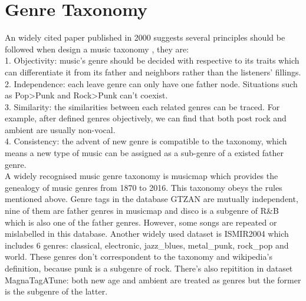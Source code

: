 \documentclass[a4paper, 11pt]{report}
\begin{document}
\section{Genre Taxonomy} 
 An widely cited paper published in 2000 suggests several principles should be followed when design a music taxonomy \cite{pachet2000taxonomy}, they are:\\
 1. Objectivity: music's genre should be decided with respective to its traits which can differentiate it from its father and neighbors rather than the listeners' fillings.\\
 2. Independence: each leave genre can only have one father node. Situations such as Pop\textgreater Punk and Rock\textgreater Punk can't coexist.\\
 3. Similarity: the similarities between each related genres can be traced. For example, after defined genres objectively, we can find that both post rock and ambient are usually non-vocal.\\
 4. Consistency: the advent of new genre is compatible to the taxonomy, which means a new type of music can be assigned as a sub-genre of a existed father genre.\\
A widely recognised music genre taxonomy is musicmap which provides the genealogy of music genres from 1870 to 2016. This taxonomy obeys the rules mentioned above. Genre tags in the database GTZAN are mutually independent, nine of them are father genres in musicmap and disco is a subgenre of R\&B which is also one of the father genres. However, some songs are repeated or mislabelled in this database\cite{sturm2013gtzan}. Another widely used dataset is ISMIR2004 which includes 6 genres: classical, electronic, jazz\_blues, metal\_punk, rock\_pop and world. These genres don't correspondent to the taxonomy and wikipedia's definition, because punk is a subgenre of rock. There's also repitition in dataset MagnaTagATune: both new age and ambient are treated as genres but the former is the subgenre of the latter.



\end{document}
